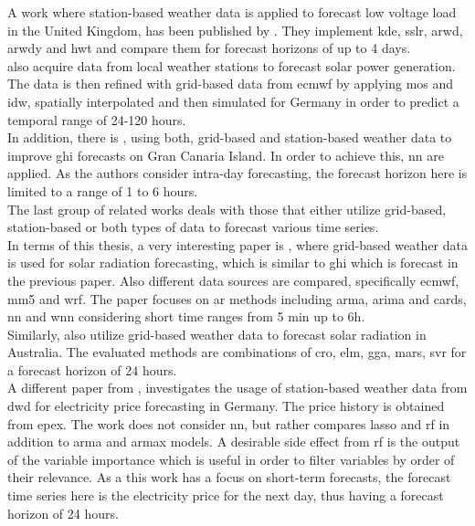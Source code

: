 A work where station-based weather data is applied to forecast low voltage load in the United Kingdom, has been published by . They implement \gls{kde}, \gls{sslr}, \gls{arwd}, \gls{arwdy} and \gls{hwt} and compare them for forecast horizons of up to 4 days.\\
 also acquire data from local weather stations to forecast solar power generation. The data is then refined with grid-based data from \gls{ecmwf} by applying \gls{mos} and \gls{idw}, spatially interpolated and then simulated for Germany in order to predict a temporal range of 24-120 hours.\\
In addition, there is \eg {}, using both, grid-based and station-based weather data to improve \gls{ghi} forecasts on Gran Canaria Island. In order to achieve this, \gls{nn} are applied. As the authors consider intra-day forecasting, the forecast horizon here is limited to a range of 1 to 6 hours.\\
The last group of related works deals with those that either utilize grid-based, station-based or both types of data to forecast various time series.\\
In terms of this thesis, a very interesting paper is , where grid-based weather data is used for solar radiation forecasting, which is similar to \gls{ghi} which is forecast in the previous paper. Also different data sources are compared, specifically \gls{ecmwf}, \gls{mm5} and \gls{wrf}. The paper focuses on \gls{ar} methods including \gls{arma}, \gls{arima} and \gls{cards}, \gls{nn} and \gls{wnn} considering short time ranges from 5 min up to 6h.\\
Similarly,  also utilize grid-based weather data to forecast solar radiation in Australia. The evaluated methods are combinations of \gls{cro}, \gls{elm}, \gls{gga}, \gls{mars}, \gls{svr} for a forecast horizon of 24 hours.\\
A different paper from , investigates the usage of station-based weather data from \gls{dwd} for electricity price forecasting in Germany. The price history is obtained from \gls{epex}. The work does not consider \gls{nn}, but rather compares \gls{lasso} and \gls{rf} in addition to \gls{arma} and \gls{armax} models. A desirable side effect from \gls{rf} is the output of the variable importance which is useful in order to filter variables by order of their relevance. As a this work has a focus on short-term forecasts, the forecast time series here is the electricity price for the next day, thus having a forecast horizon of 24 hours.\\

